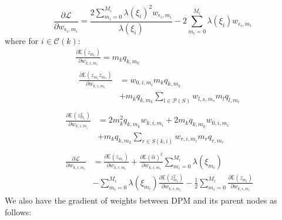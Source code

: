 \documentclass[review]{elsarticle}
\begin{document}
\begin{equation*}
\frac{\partial \mathcal{L}}{\partial w_{\epsilon_{i}, m_{i}}}
= \frac{2\sum_{m_{i} = 0}^{M_{i}}\lambda(\xi_{i})^{2}w_{\epsilon_{i}, m_{i}}}{\lambda(\xi_{i})} - 2\sum_{m_{i} = 0}^{M_{i}}\lambda(\xi_{i})w_{\epsilon_{i}, m_{i}}
\end{equation*}
\noindent where for $i \in \mathcal{C}(k)$: 
\begin{eqnarray*}
&& \frac{\partial \mathbb{E}(z_{m_{i}})}{\partial w_{k, i, m_{i}}}  = m_{k}q_{k, m_{k}}\\
&& 
\begin{aligned}
\frac{\partial \mathbb{E}(z_{m_{i}}z_{m_{s}})}{\partial w_{k, i, m_{i}}} & = w_{0,i,m_{i}}m_{k}q_{k, m_{k}} \\
& + m_{k}q_{k, m_{k}}\sum_{l \in \mathcal{P}(S)}w_{l,s,m_{s}}m_{l}q_{l,m_{l}}
\end{aligned}
\end{eqnarray*}
\begin{eqnarray*}
&&
\begin{aligned}
 \frac{\partial \mathbb{E}(z_{m_{i}}^{2})}{\partial w_{k, i, m_{i}}} & = 2m_{k}^{2}q_{k, m_{k}}w_{k,i,m_{i}} + 2m_{k}q_{k, m_{k}}w_{0,i,m_{i}} \\
 & + m_{k}q_{k, m_{k}}\sum_{r \in S(k,i)}w_{r, i, m_{i}}m_{r}q_{r, m_{r}}
 \end{aligned}
\\
&&
\begin{aligned}
\frac{\partial \mathcal{L}}{\partial w_{k, i, m_{i}}} & 
= \frac{\partial \mathbb{E}(z_{m_{i}})}{\partial w_{k, i, m_{i}}} + \frac{\partial \mathbb{E}(\hat{\alpha})^{2}}{\partial w_{k, i, m_{i}}}\sum_{m_{i}=0}^{M_{i}}\lambda(\xi_{m_{i}}) \\
& - \sum_{m_{i}=0}^{M_{i}}\lambda(\xi_{m_{i}})\frac{\partial \mathbb{E}(z_{m_{i}}^{2})}{\partial w_{k, i, m_{i}}} 
- \frac{1}{2}\sum_{m_{i}=0}^{M_{i}}\frac{\partial \mathbb{E}(z_{m_{i}})}{\partial w_{k, i, m_{i}}}
\end{aligned}
\end{eqnarray*}
We also have the gradient of weights between DPM and its parent nodes as follows:
\end{document}
